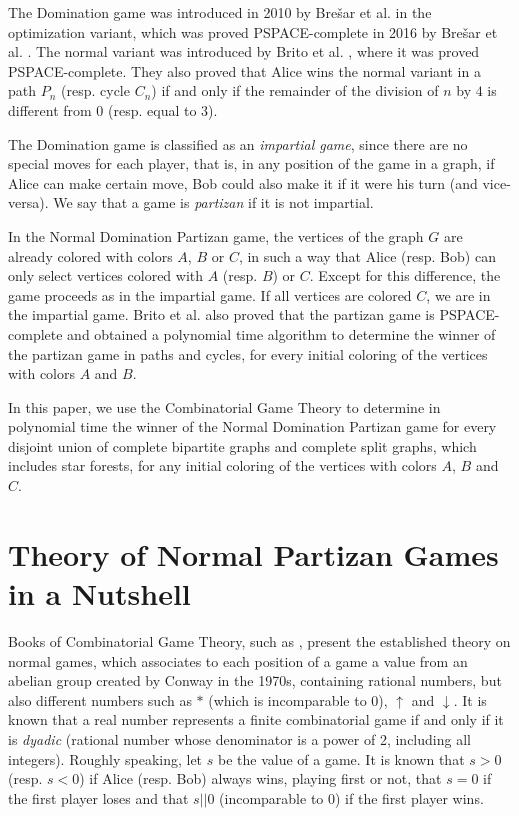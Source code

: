 \documentclass[a4paper,11pt]{article}
\begin{document}
The Domination game was introduced in 2010 by Bre\v{s}ar et al. \cite{bresar10} in the optimization variant, which was proved PSPACE-complete in 2016 by Bre\v{s}ar et al. \cite{bresar16}. The normal variant was introduced by Brito et al. \cite{brito25}, where it was proved PSPACE-complete. They also proved that Alice wins the normal variant in a path $P_n$ (resp. cycle $C_n$) if and only if the remainder of the division of $n$ by $4$ is different from $0$ (resp. equal to $3$).

The Domination game is classified as an \emph{impartial game}, since there are no special moves for each player, that is, in any position of the game in a graph, if Alice can make certain move, Bob could also make it if it were his turn (and vice-versa). We say that a game is \emph{partizan} if it is not impartial.

In the Normal Domination Partizan game, the vertices of the graph $G$ are already colored with colors $A$, $B$ or $C$, in such a way that Alice (resp. Bob) can only select vertices colored with $A$ (resp. $B$) or $C$. Except for this difference, the game proceeds as in the impartial game. If all vertices are colored $C$, we are in the impartial game. Brito et al. \cite{brito25} also proved that the partizan game is PSPACE-complete and obtained a polynomial time algorithm to determine the winner of the partizan game in paths and cycles, for every initial coloring of the vertices with colors $A$ and $B$.

In this paper, we use the Combinatorial Game Theory to determine in polynomial time the winner of the Normal Domination Partizan game for every disjoint union of complete bipartite graphs and complete split graphs, which includes star forests, for any initial coloring of the vertices with colors $A$, $B$ and $C$.

\section{Theory of Normal Partizan Games in a Nutshell}

Books of Combinatorial Game Theory, such as \cite{rudini26,conway82,siegel13}, present the established theory on normal games, which associates to each position of a game a value from an abelian group created by Conway \cite{conway76} in the 1970s, containing rational numbers, but also different numbers such as $*$ (which is incomparable to $0$), $\uparrow$ and $\downarrow$.
%
It is known that a real number represents a finite combinatorial game if and only if  it is \emph{dyadic} (rational number whose denominator is a power of 2, including all integers).
Roughly speaking, let $s$ be the value of a game. It is known that $s>0$ (resp. $s<0$) if Alice (resp. Bob) always wins, playing first or not, that $s=0$ if the first player loses and that $s||0$ (incomparable to $0$) if the first player wins. 
\end{document}
